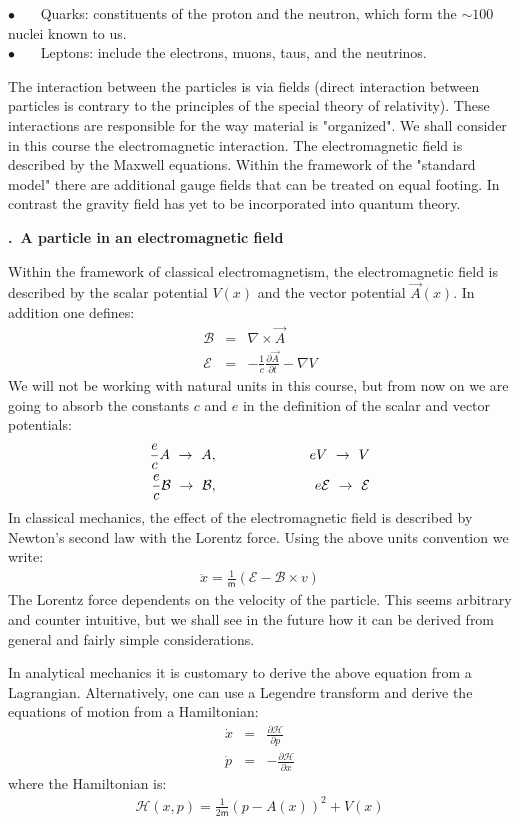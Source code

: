\documentclass[onecolumn,fleqn, 11pt]{revtex4}
\newcommand{\mass}{\mathsf{m}}
\newcommand{\bitem}{$\bullet$ \ \ \ }
\newcommand{\beq}{\begin{eqnarray}}
\newcommand{\eeq}{\end{eqnarray}}
\renewcommand{\thesubsection}{\arabic{subsection}}
\renewcommand{\thesubsubsection}{\arabic{subsubsection}}
\newcommand{\sheadC}[1]
{
\addtocounter{subsubsection}{1}
\vspace{5mm}
{\bf \thesubsection.\thesubsubsection \ #1}  
\nopagebreak
\phantomsection
}
\begin{document}
\bitem Quarks: constituents of the proton and the neutron, 
which form the $\sim100$ nuclei known to us. \\
\bitem Leptons: include the electrons, muons, taus, and the neutrinos.

The interaction between the particles is via fields 
(direct interaction between particles is contrary to the 
principles of the special theory of relativity). 
These interactions are responsible for the way material is "organized". 
We shall consider in this course the electromagnetic interaction. 
The electromagnetic field is described by the Maxwell equations.
Within the framework of the "standard model" there are 
additional gauge fields that can be treated on equal footing.
In contrast the gravity field has yet to be incorporated 
into quantum theory. 

\sheadC{A particle in an electromagnetic field} 

Within the framework of classical electromagnetism, the electromagnetic 
field is described by the scalar potential ${V(x)}$ and the 
vector potential ${\vec{A}(x)}$. In addition one defines:
\beq
\mathcal{B} 
&=& \nabla \times \vec{A} 
\\ \nonumber
\mathcal{E} 
&=& - \frac{1}{c} \frac{ \partial \vec{A}}{\partial {t}} - \nabla{V}
\eeq
We will not be working with natural units in this 
course, but from now on we are going to absorb 
the constants $c$ and $e$ in the definition 
of the scalar and vector potentials: 
\beq
\frac{e}{c} A  \ \rightarrow \ A,
&\hspace*{2cm}&
eV \ \rightarrow \ V 
\\ \nonumber
\frac{e}{c} \mathcal{B}  \ \rightarrow \ \mathcal{B}, 
&\hspace*{2cm}&
e\mathcal{E} \ \rightarrow \ \mathcal{E}
\eeq
In classical mechanics, the effect of the electromagnetic 
field is described by Newton's second law with the Lorentz
force. Using the above units convention we write: 
\beq
\ddot{x} = \frac{1}{\mass} \left(\mathcal{E} 
- \mathcal{B} \times v \right)
\eeq
The Lorentz force dependents on the velocity of 
the particle. This seems arbitrary and counter intuitive, 
but we shall see in the future how it can be derived 
from general and fairly simple considerations.   

In analytical mechanics it is customary to derive 
the above equation from a Lagrangian. Alternatively, 
one can use a Legendre transform and derive the equations 
of motion from a Hamiltonian:
\beq
\dot{x} &=& \frac{\partial{\mathcal{H}}}{\partial{p}} 
\\ \nonumber
\dot{p} &=& -\frac{\partial{\mathcal{H}}}{\partial{x}} 
\eeq
where the Hamiltonian is: 
\beq
\mathcal{H}(x,p) = \frac{1}{2\mass}(p-A(x))^2 + V(x) 
\eeq
\end{document}
